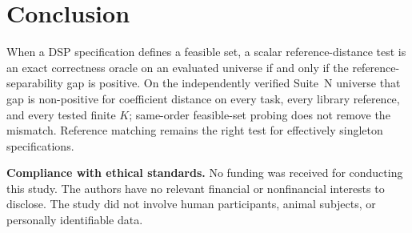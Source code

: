 \documentclass{article}
\begin{document}
\section{Conclusion}
\label{sec:conc}

When a DSP specification defines a feasible set, a scalar
reference-distance test is an exact correctness oracle on an
evaluated universe if and only if the reference-separability gap is
positive.
On the independently verified Suite~N universe that gap is
non-positive for coefficient distance on every task, every library
reference, and every tested finite $K$; same-order feasible-set
probing does not remove the mismatch.
Reference matching remains the right test for effectively singleton
specifications.

\clearpage
\noindent\textbf{Compliance with ethical standards.}
No funding was received for conducting this study.
The authors have no relevant financial or nonfinancial interests
to disclose.
The study did not involve human participants, animal subjects, or
personally identifiable data.



\end{document}
